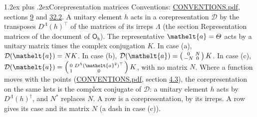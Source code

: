 \documentclass[10pt,a4paper]{article}
\makeatletter
\renewcommand\section{\@startsection{section}{1}{\z@}{-3ex plus -1ex minus -.2ex}%
  {1.2ex plus .2ex}{\normalfont\large\sffamily\bfseries\color{parttitle}}}
\numberwithin{equation}{section}
\newcommand{\eltfont}[1]{{\let\sigma\eltsigma\mathelt{#1}}}
\newcommand{\grp}[1]{\mathsf{#1}}
\newcommand{\elt}[1]{\eltfont{#1}}
\makeatother
\begin{document}
\section{Corepresentation matrices}\label{s:corep_matrices}
Conventions: \href{../../CONVENTIONS.pdf}{CONVENTIONS.pdf}, sections \href{../../../rotation/CONVENTIONS.pdf\#conv.9}{9} and \href{../../CONVENTIONS.pdf\#conv.32.2}{32.2}.
A unitary element $h$ acts in a corepresentation $\mathcal{D}$ by the transposes $D^{\Lambda}(h)^{\top}$ of the matrices of its irreps $\Lambda$ (the section Representation matrices of the document of \href{../../../rotation/data/pdf/Oh.pdf}{$\grp{O_{h}}$}). The representative $\elt{a} = \varTheta$ acts by a unitary matrix times the complex conjugation $K$.
In case (a), $\mathcal{D}(\elt{a}) = NK$. In case (b), $\mathcal{D}(\elt{a}) = \left(\begin{smallmatrix} 0 & N \\ -N & 0 \end{smallmatrix}\right) K$. In case (c), $\mathcal{D}(\elt{a}) = \left(\begin{smallmatrix} 0 & D^{\Lambda}(\elt{a}^2)^{\top} \\ 1 & 0 \end{smallmatrix}\right) K$, with no matrix $N$.
Where a function moves with the points (\href{../../CONVENTIONS.pdf}{CONVENTIONS.pdf}, section \href{../../../rotation/CONVENTIONS.pdf\#conv.4.3}{4.3}), the corepresentation on the same kets is the complex conjugate of $\mathcal{D}$: a unitary element $h$ acts by $D^{\Lambda}(h)^{\dagger}$, and $N^{*}$ replaces $N$.
A row is a corepresentation, by its irreps. A row gives its case and its matrix $N$ (a dash in case (c)).
\end{document}
